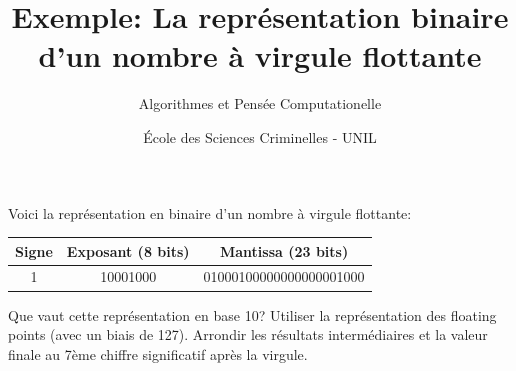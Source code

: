 \documentclass{beamer}
\title{Exemple: La représentation binaire d'un nombre à virgule flottante\newline}
\subtitle{Algorithmes et Pensée Computationelle}
\author{École des Sciences Criminelles - UNIL}
\date{}
\begin{document}
\begin{frame}
\titlepage
\end{frame}

\begin{frame}
Voici la représentation en binaire d'un nombre à virgule flottante: 
\begin{table}[h]
\centering
\renewcommand{\arraystretch}{1.3}
\begin{tabular}{|c|c|c|}
\hline
\textbf{Signe} & \textbf{Exposant (8 bits)} & \textbf{Mantissa (23 bits)} \\
\hline
1 & 10001000 & 01000100000000000001000 \\
\hline
\end{tabular}
\end{table}
Que vaut cette représentation en base 10? Utiliser la représentation des floating points (avec un biais de 127). Arrondir les résultats intermédiaires et la valeur finale au 7ème chiffre significatif après la virgule.

\end{frame}
\end{document}
